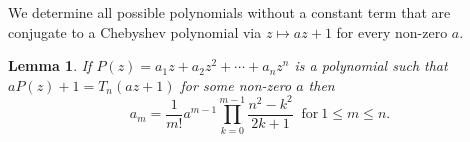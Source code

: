 \documentclass[12pt,a4paper]{article}
\theoremstyle{plain}
\newtheorem{lemma}{Lemma}
\newtheorem{rem}{Remark}[section]
\numberwithin{equation}{section}
\begin{document}
%


We determine all possible  polynomials without a constant term that are conjugate to  a Chebyshev  polynomial via $z \mapsto az+1$ for every non-zero $a$.
 
\begin{lemma} 
If $P(z)=a_1z+a_2z^2+\cdots+a_nz^n$ is a polynomial  such that $aP(z)+1=T_n(az+1)$ for some non-zero $a$ then $$a_m=\frac{1}{m!}a^{m-1}\prod_{k=0}^{m-1}\frac{n^2-k^2}{2k+1}~\mbox{ for}~ 1\le m \le n.$$
 \label{poly}
\end{lemma}
\end{document}
